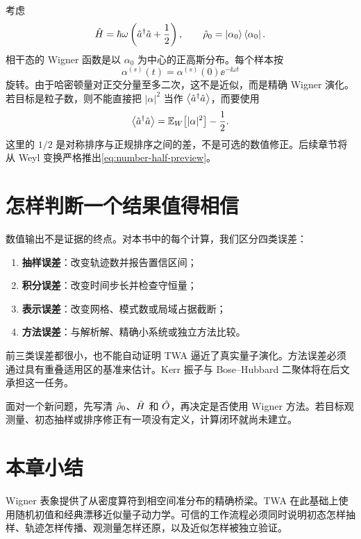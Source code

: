 考虑
\begin{equation}
  \hat H=\hbar\omega\left(\hat a^{\dagger}\hat a+\frac12\right),
  \qquad \hat\rho_0=\left\lvert \alpha_0\right\rangle\left\langle \alpha_0\right\rvert.
\end{equation}
相干态的 Wigner 函数是以 $\alpha_0$ 为中心的正高斯分布。每个样本按
\begin{equation}
  \alpha^{(s)}(t)=\alpha^{(s)}(0)\ee^{-\ii\omega t}
  \label{eq:harmonic-trajectory-preview}
\end{equation}
旋转。由于哈密顿量对正交分量至多二次，这不是近似，而是精确 Wigner 演化。若目标是粒子数，则不能直接把 $|\alpha|^2$ 当作 $\left\langle \hat a^{\dagger}\hat a\right\rangle$，而要使用
\begin{equation}
  \left\langle \hat a^{\dagger}\hat a\right\rangle
  =\mathbb{E}_{W}\!\left[|\alpha|^2\right]-\frac12.
  \label{eq:number-half-preview}
\end{equation}
这里的 $1/2$ 是对称排序与正规排序之间的差，不是可选的数值修正。后续章节将从 Weyl 变换严格推出\cref{eq:number-half-preview}。

\section{怎样判断一个结果值得相信}

数值输出不是证据的终点。对本书中的每个计算，我们区分四类误差：
\begin{enumerate}
  \item \textbf{抽样误差}：改变轨迹数并报告置信区间；
  \item \textbf{积分误差}：改变时间步长并检查守恒量；
  \item \textbf{表示误差}：改变网格、模式数或局域占据截断；
  \item \textbf{方法误差}：与解析解、精确小系统或独立方法比较。
\end{enumerate}
前三类误差都很小，也不能自动证明 TWA 逼近了真实量子演化。方法误差必须通过具有重叠适用区的基准来估计。Kerr 振子与 Bose--Hubbard 二聚体将在后文承担这一任务。

\begin{chaptercheck}
面对一个新问题，先写清 $\hat\rho_0$、$\hat H$ 和 $\hat O$，再决定是否使用 Wigner 方法。若目标观测量、初态抽样或排序修正有一项没有定义，计算闭环就尚未建立。
\end{chaptercheck}

\section*{本章小结}

Wigner 表象提供了从密度算符到相空间准分布的精确桥梁。TWA 在此基础上使用随机初值和经典漂移近似量子动力学。可信的工作流程必须同时说明初态怎样抽样、轨迹怎样传播、观测量怎样还原，以及近似怎样被独立验证。

